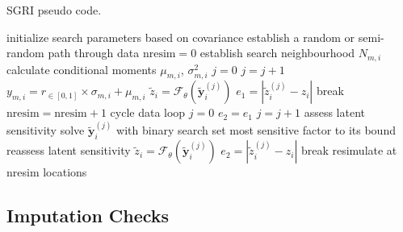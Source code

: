 \begin{algorithm}
    \caption{SGRI pseudo code.}\label{alg:sgri}
    \begin{algorithmic}[1]
        \State initialize search parameters based on covariance
         
        \State establish a random or semi-random path through data
        \State $\text{nresim} = 0$
         
         
        \State establish search neighbourhood $N_{m,i}$
        \State calculate conditional moments $\mu_{m,i}$, $\sigma_{m,i}^{2}$
        \EndFor {}
        \State $j = 0$
         
        \State $j = j + 1$
        \State $y_{m, i} = r_{\in[0,1]} \times \sigma_{m,i} + \mu_{m,i}$ 
        \EndFor
        \State $\tilde{z}_{i} = \mathcal{F}_{\theta}(\tilde{\mathbf{y}}_{i}^{{(j)}})$
        \State $e_{1} = |\tilde{z}_{i}^{(j)} - z_{i}|$ 
        \State break
        \EndIf
        \EndWhile {}
        \State $\text{nresim} = \text{nresim} + 1$
        \State cycle data loop
        \EndIf
        \State $j = 0$
        \State $e_{2} = e_{1}$
         
        \State $j = j + 1$
        \State assess latent sensitivity
        \State solve $\tilde{\mathbf{y}}_{i}^{(j)}$ with binary search
        \Else
        \State set most sensitive factor to its bound
        \State reassess latent sensitivity
        \EndIf
        \State $\tilde{z}_{i} = \mathcal{F}_{\theta}(\tilde{\mathbf{y}}_{i}^{(j)})$
        \State $e_{2} = |\tilde{z}_{i}^{(j)} - z_{i}|$ 
        \State break
        \EndIf
        \EndWhile {}
        \EndFor {}
        \State resimulate at nresim locations
        \EndIf
        \EndFor {}
    \end{algorithmic}
\end{algorithm}


\FloatBarrier
\subsection{Imputation Checks}
\label{subsec:05impcheck}

